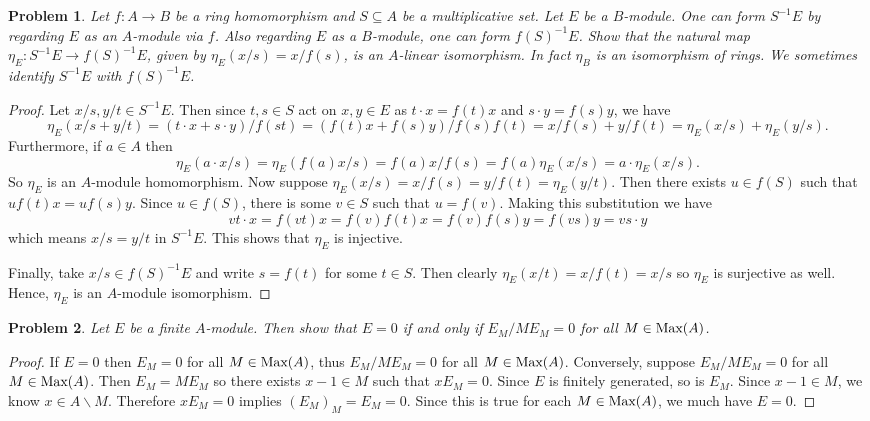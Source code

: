 \documentclass{article}
\newcommand{\Max}{\textup{Max}}
\newtheorem{problem}{Problem}
\begin{document}
\begin{problem}
Let $f : A \to B$ be a ring homomorphism and $S \subseteq A$ be a multiplicative set. Let $E$ be a $B$-module. One can form $S^{-1}E$ by regarding $E$ as an $A$-module via $f$. Also regarding $E$ as a $B$-module, one can form $f(S)^{-1}E$. Show that the natural map $\eta_E : S^{-1}E \to f(S)^{-1}E$, given by $\eta_E(x/s) = x/f(s)$, is an $A$-linear isomorphism. In fact $\eta_B$ is an isomorphism of rings. We sometimes identify $S^{-1}E$ with $f(S)^{-1}E$.
\end{problem}
\begin{proof}
Let $x/s, y/t \in S^{-1}E$. Then since $t,s \in S$ act on $x,y \in E$ as $t \cdot x = f(t)x$ and $s \cdot y = f(s)y$, we have
\[
\eta_E(x/s + y/t) = (t \cdot x + s \cdot y)/f(st) = (f(t)x + f(s)y)/f(s)f(t) = x/f(s) + y/f(t) = \eta_E(x/s) + \eta_E(y/s).
\]
Furthermore, if $a \in A$ then
\[
\eta_E(a \cdot x/s) = \eta_E(f(a)x/s) = f(a)x/f(s) = f(a) \eta_E(x/s) = a \cdot \eta_E(x/s).
\]
So $\eta_E$ is an $A$-module homomorphism. Now suppose $\eta_E(x/s) = x/f(s) = y/f(t) = \eta_E(y/t)$. Then there exists $u \in f(S)$ such that $uf(t)x = uf(s)y$. Since $u \in f(S)$, there is some $v \in S$ such that $u = f(v)$. Making this substitution we have
\[
vt \cdot x = f(vt)x = f(v)f(t)x = f(v)f(s)y = f(vs)y = vs \cdot y
\]
which means $x/s = y/t$ in $S^{-1}E$. This shows that $\eta_E$ is injective.

Finally, take $x/s \in f(S)^{-1}E$ and write $s = f(t)$ for some $t \in S$. Then clearly $\eta_E(x/t) = x/f(t) = x/s$ so $\eta_E$ is surjective as well. Hence, $\eta_E$ is an $A$-module isomorphism.
\end{proof}

\begin{problem}
Let $E$ be a finite $A$-module. Then show that $E = 0$ if and only if $E_M/ME_M = 0$ for all $M \in \Max(A)$.
\end{problem}
\begin{proof}
If $E = 0$ then $E_M = 0$ for all $M \in \Max(A)$, thus $E_M/ME_M = 0$ for all $M \in \Max(A)$. Conversely, suppose $E_M/ME_M = 0$ for all $M \in \Max(A)$. Then $E_M = ME_M$ so there exists $x-1 \in M$ such that $xE_M = 0$. Since $E$ is finitely generated, so is $E_M$. Since $x-1 \in M$, we know $x \in A \backslash M$. Therefore $xE_M = 0$ implies $(E_M)_M = E_M = 0$. Since this is true for each $M \in \Max(A)$, we much have $E = 0$.
\end{proof}
\end{document}
